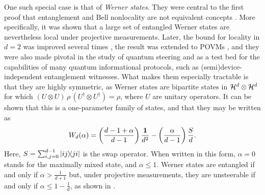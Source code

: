 		One such special case is that of \emph{Werner states}. They were central to the first proof that entanglement and Bell nonlocality \cite{rabelo_dissertacao,brunner_2014_nonlocality} are not equivalent concepts \cite{werner_1989}. More specifically, it was shown that a large set of entangled Werner states are nevertheless local under projective measurements. Later, the bound for locality in $d=2$ was improved several times \cite{acin_2006_grothendieck,vertesi_2008_moreefficient,hirsch_2017_betterlocalhidden}, the result was extended to POVMs \cite{barrett_2002_povmslocality}, and they were also made pivotal in the study of quantum steering \cite{wiseman_2007_steering,cavalcanti_2016_steering,uola_2020_steering} and as a test bed for the capabilities of many quantum informational protocols, such as (semi)device-independent entanglement witnesses. What makes them especially tractable is that they are highly symmetric, as Werner states are bipartite states in $\mathcal{H}^{d} \otimes \mathcal{H}^{d}$ for which $(U \otimes U) \,\rho\, (U^\dagger \otimes U^\dagger) = \rho$, where $U$ are unitary operators. It can be shown that this is a one-parameter family of states, and that they may be written as
		\begin{equation}
			W_d(\alpha) = \left( \frac{d-1+\alpha}{d-1} \right) \frac{\mathbf{1}}{d^2} - \left( \frac{\alpha}{d-1} \right) \frac{S}{d} .
			\label{eq:werner-states}
		\end{equation}
		Here, $S = \sum_{i,j=0}^{d-1} \ketbra{ij}{ji}$ is the swap operator. When written in this form, $\alpha = 0$ stands for the maximally mixed state, and $\alpha \leq 1$. Werner states are entangled if and only if $\alpha > \frac{1}{d+1}$ but, under projective measurements, they are unsteerable if and only if $\alpha \leq 1 - \frac{1}{d}$, as shown in \cite{wiseman_2007_steering}. 
	
